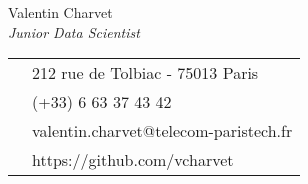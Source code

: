 \documentclass[a4paper,10.5pt]{article}
\begin{document}
	\vspace{2cm}
	\begin{paracol}{2}
		\begin{leftcolumn}
			\centering
			{\huge Valentin Charvet } \\
			\vspace{0.2cm}
			\huge \textit{Junior Data Scientist}%
		\end{leftcolumn}
		
		\begin{rightcolumn}
			\colorbox{shade}{
				\begin{tabular}{c|l}
						\faHome & \large212 rue de Tolbiac - 75013 Paris \\
						\faPhoneSquare & \large (+33) 6 63 37 43 42 \\
						\faEnvelope &\large valentin.charvet@telecom-paristech.fr \\
						\faGithub &\large https://github.com/vcharvet \\
				\end{tabular}
			}
	
	\end{rightcolumn}
			
	\end{paracol}
	


\setlength{\columnsep}{0.75cm}
\setlength{\columnseprule}{0.1pt}
	
\end{document}

